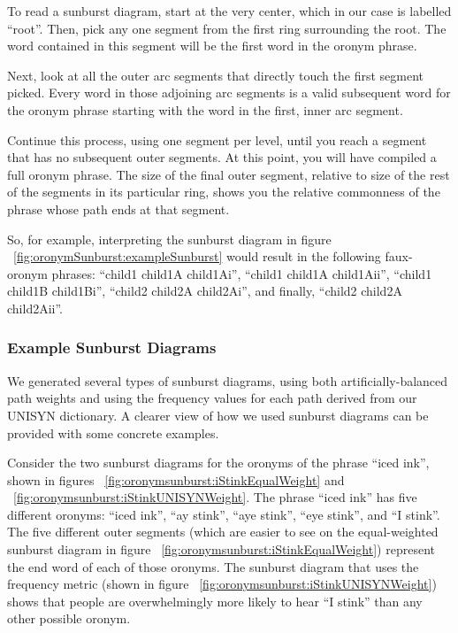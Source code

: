 To read a sunburst diagram, start at the very center, which in our case is labelled ``root''. Then, pick any one segment from the first ring surrounding the root. The word contained in this segment will be the first word in the oronym phrase.

Next, look at all the outer arc segments that directly touch the first segment picked. Every word in those adjoining arc segments is a valid subsequent word for the oronym phrase starting with the word in the first, inner arc segment.

Continue this process, using one segment per level, until you reach a segment that has no subsequent outer segments. At this point, you will have compiled a full oronym phrase. The size of the final outer segment, relative to size of the rest of the segments in its particular ring, shows you the relative commonness of the phrase whose path ends at that segment.

So, for example, interpreting the sunburst diagram in figure ~\ref{fig:oronymSunburst:exampleSunburst} would result in the following faux-oronym phrases: ``child1 child1A child1Ai'', ``child1 child1A child1Aii'', ``child1 child1B child1Bi'', ``child2 child2A child2Ai'', and finally, ``child2 child2A child2Aii''.

\subsubsection{Example Sunburst Diagrams}
\label{subsection:oronymsunburst:exampleSunburstDiagrams}

We generated several types of sunburst diagrams, using both artificially-balanced path weights and using the frequency values for each path derived from our UNISYN dictionary.  A clearer view of how we used sunburst diagrams can be provided with some concrete examples. 

Consider the two sunburst diagrams for the oronyms of the phrase ``iced ink'', shown in figures ~\ref{fig:oronymsunburst:iStinkEqualWeight} and ~\ref{fig:oronymsunburst:iStinkUNISYNWeight}. The phrase ``iced ink'' has five different oronyms: ``iced ink'', ``ay stink'', ``aye stink'', ``eye stink'', and ``I stink''. The five different outer segments (which are easier to see on the equal-weighted sunburst diagram in figure ~\ref{fig:oronymsunburst:iStinkEqualWeight}) represent the end word of each of those oronyms. The sunburst diagram that uses the frequency metric (shown in figure ~\ref{fig:oronymsunburst:iStinkUNISYNWeight}) shows that people are overwhelmingly more likely to hear ``I stink'' than any other possible oronym.


